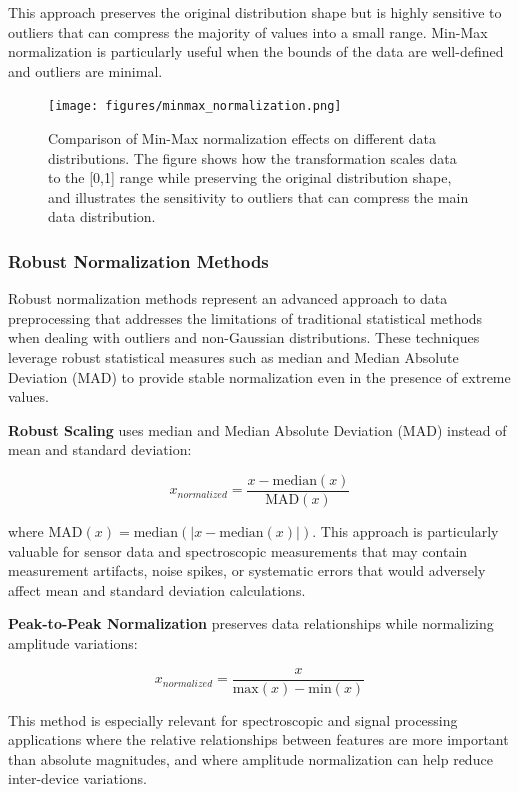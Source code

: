This approach preserves the original distribution shape but is highly sensitive to outliers that can compress the majority of values into a small range. Min-Max normalization is particularly
useful when the bounds of the data are well-defined and outliers are minimal.

\begin{figure}[htbp]
  \centering
  \texttt{[image: figures/minmax\_normalization.png]}
  \caption{Comparison of Min-Max normalization effects on different data distributions. The figure shows how the transformation scales data to the [0,1] range while preserving the original
distribution shape, and illustrates the sensitivity to outliers that can compress the main data distribution.}
  \label{fig:minmax_norm}
\end{figure}

\subsubsection{Robust Normalization Methods}

Robust normalization methods represent an advanced approach to data preprocessing that addresses the limitations of traditional statistical methods when dealing with outliers and non-Gaussian
distributions. These techniques leverage robust statistical measures such as median and Median Absolute Deviation (MAD) to provide stable normalization even in the presence of extreme values.

\textbf{Robust Scaling} uses median and Median Absolute Deviation (MAD) instead of mean and standard deviation:

\begin{equation}
x_{normalized} = \frac{x - \text{median}(x)}{\text{MAD}(x)}
\end{equation}

where $\text{MAD}(x) = \text{median}(|x - \text{median}(x)|)$. This approach is particularly valuable for sensor data and spectroscopic measurements that may contain measurement artifacts, noise
spikes, or systematic errors that would adversely affect mean and standard deviation calculations.

\textbf{Peak-to-Peak Normalization} preserves data relationships while normalizing amplitude variations:

\begin{equation}
x_{normalized} = \frac{x}{\text{max}(x) - \text{min}(x)}
\end{equation}

This method is especially relevant for spectroscopic and signal processing applications where the relative relationships between features are more important than absolute magnitudes, and where
amplitude normalization can help reduce inter-device variations.

